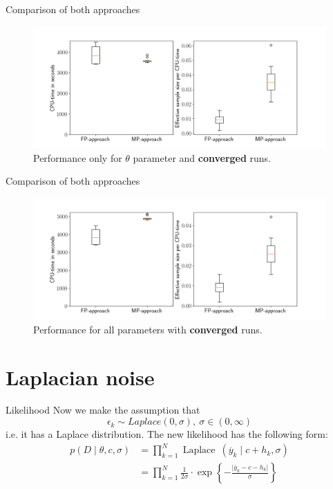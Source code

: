 \documentclass{beamer}
\begin{document}
	\begin{frame}{Comparison of both approaches}
		\begin{figure}
			\includegraphics[width=1\columnwidth]
			{plots/combination/mRNA/Boxplot_only_theta_mRNA.png}
			\caption{Performance only for $\theta$ parameter and
			 \textbf{converged} runs.}
		\end{figure}
	\end{frame}
	
	\begin{frame}{Comparison of both approaches}
		\begin{figure}
			\includegraphics[width=1\columnwidth]
			{plots/combination/mRNA/Boxplot_all_mRNA.png}
			\caption{Performance for all parameters with \textbf{converged} runs.}
		\end{figure}
	\end{frame}

\section{Laplacian noise}

	\begin{frame}{Likelihood}
		Now we make the assumption that 
		\[
			\epsilon_k \sim Laplace(0, \sigma), \ \sigma \in (0, \infty)
		\]
		i.e. it has a Laplace distribution. The new likelihood has the following 
		form:
		\begin{align*}
    		p(D \mid \theta, c, \sigma) &= \prod_{k = 1}^N \operatorname{Laplace}
    		\ (\overline{y}_k	\mid c + h_k, \sigma) \\
    		&= \prod_{k = 1}^N \frac{1}{2\sigma} \cdot \exp \left\{- 							\frac{\lvert \overline{y}_k - c- h_k \lvert}{\sigma} \right\}
		\end{align*}
	\end{frame}
	
\end{document}
